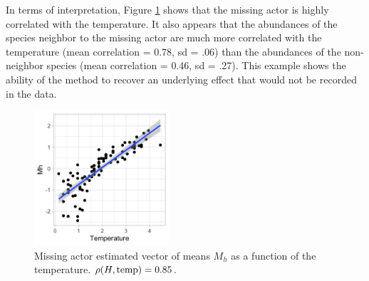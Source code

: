 In terms of interpretation, Figure \ref{fig:barents_temp} shows that the missing actor is highly correlated with the temperature. It also appears that the abundances of the species neighbor to the missing actor are much more correlated with the temperature (mean correlation = 0.78, sd = .06) than the abundances of the non-neighbor species (mean correlation = 0.46, sd = .27). This example shows the ability of the method to recover an underlying effect that would not be recorded in the data.

\begin{figure}
    \centering
    \includegraphics[width=5cm]{figs/Barents_MH_temp_white.png}
    \caption{Missing actor estimated vector of means $M_h$ as a function of the temperature. ${\rho(H, \text{temp})}=0.85$.}
    \label{fig:barents_temp}
\end{figure}



